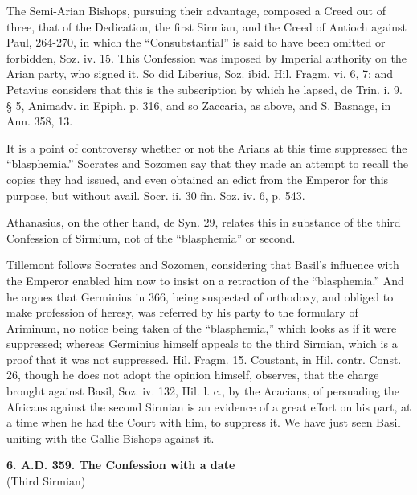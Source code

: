 
The Semi-Arian Bishops, pursuing their advantage, composed a Creed
out of three, that of the Dedication, the first Sirmian, and the Creed
of Antioch against Paul, 264-270, in which the
``Consubstantial'' is said to have been omitted or forbidden,
Soz. iv. 15. This Confession was imposed by Imperial authority
on the Arian party, who signed it. So did Liberius, Soz. ibid. Hil.
Fragm. vi. 6, 7; and Petavius considers that this is the subscription
by which he lapsed, de Trin. i. 9. § 5, Animadv. in Epiph. p. 316,
and so Zaccaria, as above, and S. Basnage, in Ann. 358, 13.

It is a point of controversy whether or not the Arians at this time
suppressed the ``blasphemia.'' Socrates and Sozomen say that
they made an attempt to recall the copies they had issued, and even
obtained an edict from the Emperor for this purpose, but without
avail. Socr. ii. 30 fin. Soz. iv. 6, p. 543.

Athanasius, on the other hand, de Syn. 29, relates this in
substance of the third Confession of Sirmium, not of the ``blasphemia''
or second.

Tillemont follows Socrates and Sozomen, considering that Basil's
influence with the Emperor enabled him now to insist on a retraction
of the ``blasphemia.'' And he argues that Germinius in 366,
being suspected of orthodoxy, and obliged to make profession of
heresy, was referred by his party to the formulary of Ariminum, no
notice being taken of the ``blasphemia,'' which looks as if it
were suppressed; whereas Germinius himself appeals to the third
Sirmian, which is a proof that it was not suppressed. Hil. Fragm. 15.
Coustant, in Hil. contr. Const. 26, though he does not adopt the
opinion himself, observes, that the charge brought against Basil, Soz.
iv. 132, Hil. l. c., by the Acacians, of persuading the Africans
against the second Sirmian is an evidence of a great effort on his
part, at a time when he had the Court with him, to suppress it. We
have just seen Basil uniting with the Gallic Bishops against it.

\textbf{6. A.D. 359. The
Confession with a date}\\
(Third Sirmian)

